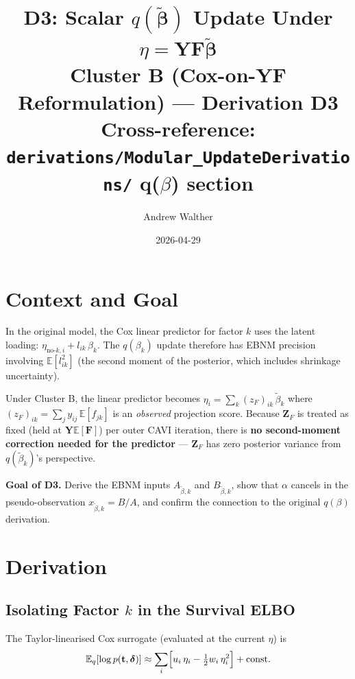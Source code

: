 \documentclass[11pt]{article}
\title{\textbf{D3: Scalar $q(\tilde{\boldsymbol{\beta}})$ Update Under $\eta = \mathbf{Y}\mathbf{F}\tilde{\boldsymbol{\beta}}$}\\[4pt]
\large Cluster B (Cox-on-YF Reformulation) — Derivation D3\\[2pt]
\normalsize Cross-reference: \texttt{derivations/Modular\_UpdateDerivations/} q($\beta$) section}
\author{Andrew Walther}
\date{2026-04-29}
\newcommand{\E}{\mathbb{E}}
\begin{document}
\maketitle
\tableofcontents
\newpage

\section{Context and Goal}

In the original model, the Cox linear predictor for factor $k$ uses the latent loading:
$\eta_{\text{no-}k,i} + l_{ik}\,\beta_k$. The $q(\beta_k)$ update therefore has EBNM
precision involving $\E[l_{ik}^2]$ (the second moment of the posterior, which includes
shrinkage uncertainty).

\bigskip
Under Cluster B, the linear predictor becomes $\eta_i = \sum_k (z_F)_{ik}\,\tilde\beta_k$
where $(z_F)_{ik} = \sum_j y_{ij}\,\E[f_{jk}]$ is an \emph{observed} projection score.
Because $\mathbf{Z}_F$ is treated as fixed (held at $\mathbf{Y}\E[\mathbf{F}]$) per outer
CAVI iteration, there is \textbf{no second-moment correction needed for the predictor} —
$\mathbf{Z}_F$ has zero posterior variance from $q(\tilde\beta_k)$'s perspective.

\bigskip
\textbf{Goal of D3.} Derive the EBNM inputs $A_{\tilde\beta,k}$ and $B_{\tilde\beta,k}$,
show that $\alpha$ cancels in the pseudo-observation $x_{\tilde\beta,k} = B/A$, and
confirm the connection to the original $q(\beta)$ derivation.

\section{Derivation}

\subsection{Isolating Factor $k$ in the Survival ELBO}

The Taylor-linearised Cox surrogate (evaluated at the current $\eta$) is
\[
  \E_q[\log p(\mathbf{t}, \boldsymbol{\delta})] \approx
  \sum_i \Bigl[ u_i\,\eta_i - \tfrac{1}{2}w_i\,\eta_i^2 \Bigr] + \text{const}.
\]
\end{document}
